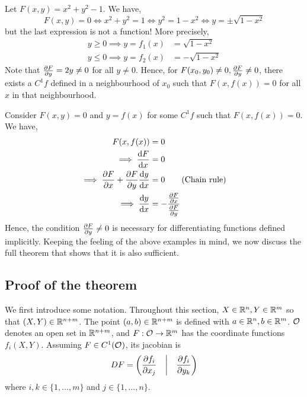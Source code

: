 \documentclass[../Analysis-3.tex]{subfiles}
\begin{document}
\begin{Eg}{}{}
  Let \( F(x,y) = x^2 + y^2 - 1 \). We have,
  \[
    F(x,y) = 0 \iff x^2 + y^2 = 1 \iff y^2 = 1 - x^2 \iff y = \pm \sqrt{1-x^2}
  \]
  but the last expression is not a function! More precisely,
  \begin{align*}
    y \geq 0 \implies y = f_1(x) & = \sqrt{1-x^2}   \\
    y \leq 0 \implies y = f_2(x) & = - \sqrt{1-x^2}
  \end{align*}
  Note that \( \pdv{F}{y} = 2y \neq 0 \) for all \( y \neq 0 \). Hence, for \( F(x_0,y_0) \neq 0, \pdv{F}{y}(x_0, y_0) \neq 0 \), there exists a \( C^1 f \) defined in a neighbourhood of \( x_0  \) such that \( F(x,f(x)) = 0 \) for all \( x \) in that neighbourhood.
\end{Eg}

\begin{noteBox}{}{}
  Consider \( F(x,y) = 0 \) and \( y = f(x) \) for some \( C^1 f \) such that \( F(x,f(x)) = 0 \).
  We have,
  \begin{align*}
    F(x,f(x))                                 & = 0                               \\
    \implies \dv{F}{x}                        & = 0                               \\
    \implies \pdv{F}{x} + \pdv{F}{y}\dv{y}{x} & = 0 \tag{Chain rule}              \\
    \implies \dv{y}{x}                        & = - \frac{\pdv{F}{x}}{\pdv{F}{y}}
  \end{align*}
  Hence, the condition \( \pdv{F}{y} \neq 0 \) is necessary for differentiating functions defined implicitly. Keeping the feeling of the above examples in mind, we now discuss the full theorem that shows that it is also sufficient.
\end{noteBox}

\subsection{Proof of the theorem}

We first introduce some notation. Throughout this section, \( X \in \mathbb{R}^n, Y \in \mathbb{R}^m \) so that \( (X,Y) \in \mathbb{R}^{n+m} \). The point \( (a,b) \in \mathbb{R}^{n+m} \) is defined with \( a \in \mathbb{R}^n, b \in \mathbb{R}^m \). \( \mathcal{O}_{} \) denotes an open set in \( \mathbb{R}^{n+m} \), and \( F: \mathcal{O}_{} \to \mathbb{R}^m \) has the coordinate functions \( f_i(X,Y) \). Assuming \( F \in C^1(\mathcal{O}_{}) \), its jacobian is
\[
  DF = \begin{pmatrix}
    \displaystyle\pdv{f_i}{x_j} & \bigg\vert & \displaystyle\pdv{f_i}{y_k}
  \end{pmatrix}
\]
where \( i,k \in \{1,\dots, m\} \) and \( j \in \{1,\dots, n\} \).
\end{document}

